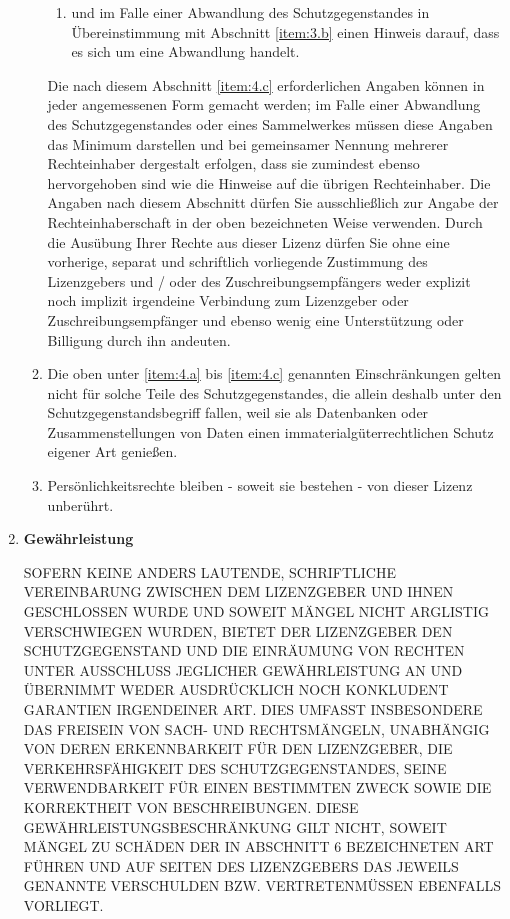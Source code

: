 \begin{enumerate}
\begin{enumerate}
\begin{enumerate}
          \item und im Falle einer Abwandlung des Schutzgegenstandes in Übereinstimmung mit Abschnitt \ref{item:3.b} einen Hinweis darauf, dass es sich um eine Abwandlung handelt.
        \end{enumerate}
Die nach diesem Abschnitt \ref{item:4.c} erforderlichen Angaben können in jeder angemessenen Form gemacht werden; im Falle einer Abwandlung des Schutzgegenstandes oder eines Sammelwerkes müssen diese Angaben das Minimum darstellen und bei gemeinsamer Nennung mehrerer Rechteinhaber dergestalt erfolgen, dass sie zumindest ebenso hervorgehoben sind wie die Hinweise auf die übrigen Rechteinhaber. Die Angaben nach diesem Abschnitt dürfen Sie ausschließlich zur Angabe der Rechteinhaberschaft in der oben bezeichneten Weise verwenden. Durch die Ausübung Ihrer Rechte aus dieser Lizenz dürfen Sie ohne eine vorherige, separat und schriftlich vorliegende Zustimmung des Lizenzgebers und / oder des Zuschreibungsempfängers weder explizit noch implizit irgendeine Verbindung zum Lizenzgeber oder Zuschreibungsempfänger und ebenso wenig eine Unterstützung oder Billigung durch ihn andeuten.
      \item Die oben unter \ref{item:4.a} bis \ref{item:4.c} genannten Einschränkungen gelten nicht für solche Teile des Schutzgegenstandes, die allein deshalb unter den Schutzgegenstandsbegriff fallen, weil sie als Datenbanken oder Zusammenstellungen von Daten einen immaterialgüterrechtlichen Schutz eigener Art genießen.
      \item Persönlichkeitsrechte bleiben - soweit sie bestehen - von dieser Lizenz unberührt.
    \end{enumerate}

  \item \label{item:5} \textbf{Gewährleistung}

SOFERN KEINE ANDERS LAUTENDE, SCHRIFTLICHE VEREINBARUNG ZWISCHEN DEM LIZENZGEBER UND IHNEN GESCHLOSSEN WURDE UND SOWEIT MÄNGEL NICHT ARGLISTIG VERSCHWIEGEN WURDEN, BIETET DER LIZENZGEBER DEN SCHUTZGEGENSTAND UND DIE EINRÄUMUNG VON RECHTEN UNTER AUSSCHLUSS JEGLICHER GEWÄHRLEISTUNG AN UND ÜBERNIMMT WEDER AUSDRÜCKLICH NOCH KONKLUDENT GARANTIEN IRGENDEINER ART. DIES UMFASST INSBESONDERE DAS FREISEIN VON SACH- UND RECHTSMÄNGELN, UNABHÄNGIG VON DEREN ERKENNBARKEIT FÜR DEN LIZENZGEBER, DIE VERKEHRSFÄHIGKEIT DES SCHUTZGEGENSTANDES, SEINE VERWENDBARKEIT FÜR EINEN BESTIMMTEN ZWECK SOWIE DIE KORREKTHEIT VON BESCHREIBUNGEN. DIESE GEWÄHRLEISTUNGSBESCHRÄNKUNG GILT NICHT, SOWEIT MÄNGEL ZU SCHÄDEN DER IN ABSCHNITT 6 BEZEICHNETEN ART FÜHREN UND AUF SEITEN DES LIZENZGEBERS DAS JEWEILS GENANNTE VERSCHULDEN BZW. VERTRETENMÜSSEN EBENFALLS VORLIEGT.


\end{enumerate}
